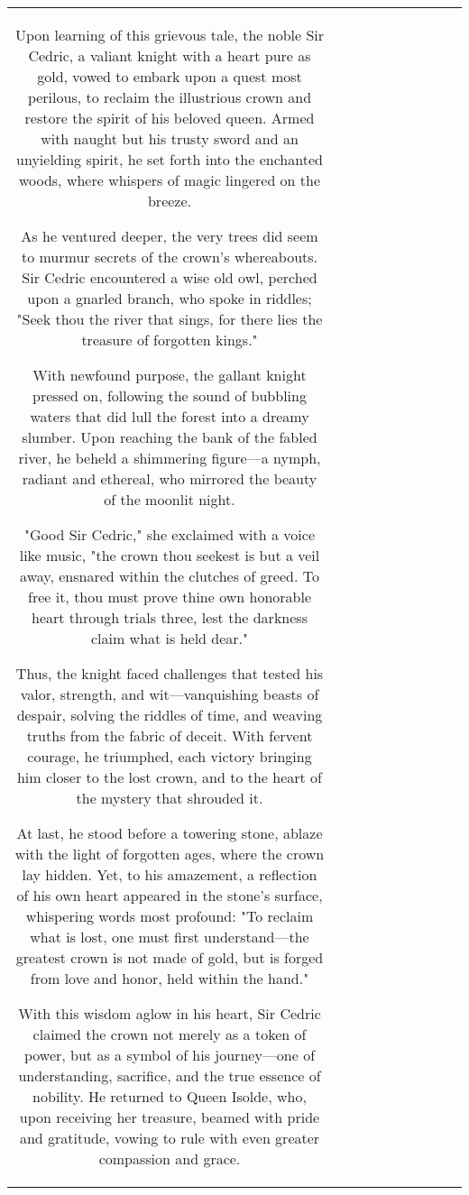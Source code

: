 \begin{table}[h!]
\begin{tabular}{|c|c|c|c|c|c|c|c|c|c|}
Upon learning of this grievous tale, the noble Sir Cedric, a valiant knight with a heart pure as gold, vowed to embark upon a quest most perilous, to reclaim the illustrious crown and restore the spirit of his beloved queen. Armed with naught but his trusty sword and an unyielding spirit, he set forth into the enchanted woods, where whispers of magic lingered on the breeze.

As he ventured deeper, the very trees did seem to murmur secrets of the crown’s whereabouts. Sir Cedric encountered a wise old owl, perched upon a gnarled branch, who spoke in riddles; "Seek thou the river that sings, for there lies the treasure of forgotten kings." 

With newfound purpose, the gallant knight pressed on, following the sound of bubbling waters that did lull the forest into a dreamy slumber. Upon reaching the bank of the fabled river, he beheld a shimmering figure—a nymph, radiant and ethereal, who mirrored the beauty of the moonlit night.

"Good Sir Cedric," she exclaimed with a voice like music, "the crown thou seekest is but a veil away, ensnared within the clutches of greed. To free it, thou must prove thine own honorable heart through trials three, lest the darkness claim what is held dear."

Thus, the knight faced challenges that tested his valor, strength, and wit—vanquishing beasts of despair, solving the riddles of time, and weaving truths from the fabric of deceit. With fervent courage, he triumphed, each victory bringing him closer to the lost crown, and to the heart of the mystery that shrouded it.

At last, he stood before a towering stone, ablaze with the light of forgotten ages, where the crown lay hidden. Yet, to his amazement, a reflection of his own heart appeared in the stone's surface, whispering words most profound: "To reclaim what is lost, one must first understand—the greatest crown is not made of gold, but is forged from love and honor, held within the hand."

With this wisdom aglow in his heart, Sir Cedric claimed the crown not merely as a token of power, but as a symbol of his journey—one of understanding, sacrifice, and the true essence of nobility. He returned to Queen Isolde, who, upon receiving her treasure, beamed with pride and gratitude, vowing to rule with even greater compassion and grace.


\end{tabular}
\end{table}
